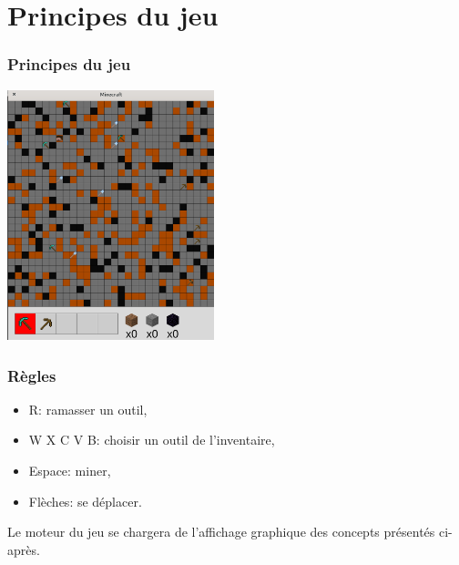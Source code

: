 \documentclass[svgnames,11pt]{beamer}
\begin{document}
\section{Principes du jeu}
\begin{frame}
    \frametitle{Principes du jeu}

    \begin{center}
        \centering
        \includegraphics[width=6cm]{ressources/jeu.png}
        \label{jeu}
    \end{center}
\end{frame}
\begin{frame}
    \frametitle{Règles}

    \begin{itemize}
        \item R: ramasser un outil,
        \item W X C V B: choisir un outil de l'inventaire,
        \item Espace: miner,
        \item Flèches: se déplacer.
    \end{itemize}

    Le moteur du jeu se chargera de l'affichage graphique des concepts présentés ci-après.
\end{frame}
\end{document}

